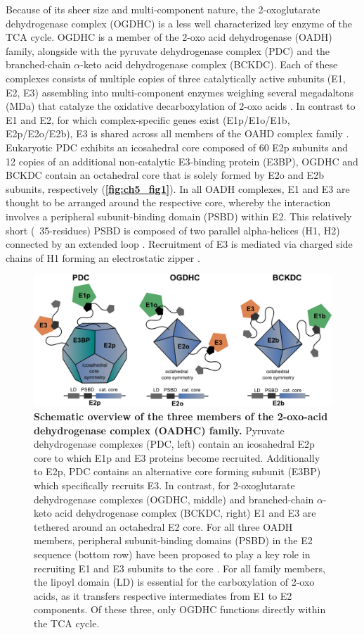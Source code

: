Because of its sheer size and multi-component nature, the 2-oxoglutarate dehydrogenase complex (OGDHC) is a less well characterized key enzyme of the TCA cycle. OGDHC is a member of the 2-oxo acid dehydrogenase (OADH) family, alongside with the pyruvate dehydrogenase complex (PDC) and the branched-chain $\alpha$-keto acid dehydrogenase complex (BCKDC). Each of these complexes consists of multiple copies of three catalytically active subunits (E1, E2, E3) assembling into multi-component enzymes weighing several megadaltons (MDa) that catalyze the oxidative decarboxylation of 2-oxo acids \cite{Reed_2001, Zhong_2022}. In contrast to E1 and E2, for which complex-specific genes exist (E1p/E1o/E1b, E2p/E2o/E2b), E3 is shared across all members of the OAHD complex family \cite{Nemeria_2021}. Eukaryotic PDC exhibits an icosahedral core composed of 60 E2p subunits and 12 copies of an additional non-catalytic E3-binding protein (E3BP), OGDHC and BCKDC contain an octahedral core that is solely formed by E2o and E2b subunits, respectively (\textbf{\autoref{fig:ch5_fig1}}). In all OADH complexes, E1 and E3 are thought to be arranged around the respective core, whereby the interaction involves a peripheral subunit-binding domain (PSBD) within E2. This relatively short (~35-residues) PSBD is composed of two parallel alpha-helices (H1, H2) connected by an extended loop \cite{Robien_1992}. Recruitment of E3 is mediated via charged side chains of H1 forming an electrostatic zipper \cite{Mande_1996}.
\begin{figure}[t!]
    \centering
    \includegraphics[]{Chapter.5/Figures/Figure1.png}
    \caption{\textbf{Schematic overview of the three members of the 2-oxo-acid dehydrogenase complex (OADHC) family.} Pyruvate dehydrogenase complexes (PDC, left) contain an icosahedral E2p core to which E1p and E3 proteins become recruited. Additionally to E2p, PDC contains an alternative core forming subunit (E3BP) which specifically recruits E3. In contrast, for 2-oxoglutarate dehydrogenase complexes (OGDHC, middle) and branched-chain $\alpha$-keto acid dehydrogenase complex (BCKDC, right) E1 and E3 are tethered around an octahedral E2 core. For all three OADH members, peripheral subunit-binding domains (PSBD) in the E2 sequence (bottom row) have been proposed to play a key role in recruiting E1 and E3 subunits to the core \cite{Perham_2000}. For all family members, the lipoyl domain (LD) is essential for the carboxylation of 2-oxo acids, as it transfers respective intermediates from E1 to E2 components. Of these three, only OGDHC functions directly within the TCA cycle.}
    \label{fig:ch5_fig1}
\end{figure}
